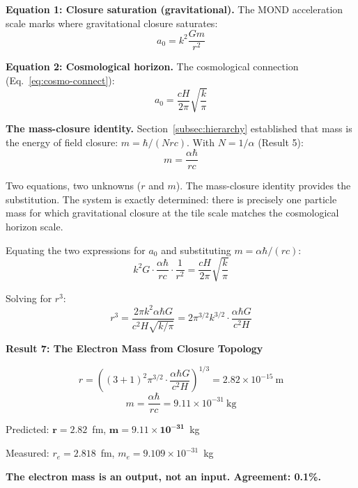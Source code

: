 \documentclass[aps,prd,preprint,superscriptaddress,showpacs,preprintnumbers,amsmath,amssymb,nofootinbib]{revtex4-2}
\begin{document}
\textbf{Equation 1: Closure saturation (gravitational).} The MOND acceleration scale marks where gravitational closure saturates:
\begin{equation}
a_0 = k^2 \frac{Gm}{r^2}
\label{eq:closure-sat}
\end{equation}

\textbf{Equation 2: Cosmological horizon.} The cosmological connection (Eq.~\ref{eq:cosmo-connect}):
\begin{equation}
a_0 = \frac{cH}{2\pi} \sqrt{\frac{k}{\pi}}
\end{equation}

\textbf{The mass-closure identity.} Section~\ref{subsec:hierarchy} established that mass is the energy of field closure: $m = \hbar/(Nrc)$. With $N = 1/\alpha$ (Result 5):
\begin{equation}
m = \frac{\alpha \hbar}{rc}
\label{eq:quantum-em}
\end{equation}

Two equations, two unknowns ($r$ and $m$). The mass-closure identity provides the substitution. The system is exactly determined: there is precisely one particle mass for which gravitational closure at the tile scale matches the cosmological horizon scale.

Equating the two expressions for $a_0$ and substituting $m = \alpha\hbar/(rc)$:
\begin{equation}
k^2 G \cdot \frac{\alpha\hbar}{rc} \cdot \frac{1}{r^2} = \frac{cH}{2\pi} \sqrt{\frac{k}{\pi}}
\end{equation}

Solving for $r^3$:
\begin{equation}
r^3 = \frac{2\pi k^2 \alpha \hbar G}{c^2 H \sqrt{k/\pi}} = 2\pi^{3/2} k^{3/2} \cdot \frac{\alpha \hbar G}{c^2 H}
\end{equation}

\vspace{1.5em}
\noindent
\colorbox{resultgreen}{\parbox{\dimexpr\textwidth-2\fboxsep\relax}{%
\vspace{0.8em}
\centering
\textbf{\large Result 7: The Electron Mass from Closure Topology}

\vspace{0.5em}
\boldmath
\begin{equation}
r = \left( (3{+}1)^2 \pi^{3/2} \cdot \frac{\alpha \hbar G}{c^2 H} \right)^{1/3} = 2.82 \times 10^{-15}~\text{m}
\end{equation}
\begin{equation}
m = \frac{\alpha \hbar}{rc} = 9.11 \times 10^{-31}~\text{kg}
\end{equation}
\unboldmath

\vspace{0.3em}
Predicted: $\bm{r = 2.82}$~fm, $\bm{m = 9.11 \times 10^{-31}}$~kg

Measured: $r_e = 2.818$~fm, $m_e = 9.109 \times 10^{-31}$~kg

\textbf{The electron mass is an output, not an input. Agreement: 0.1\%.}
\vspace{0.5em}
}}
\vspace{1cm}
\end{document}
